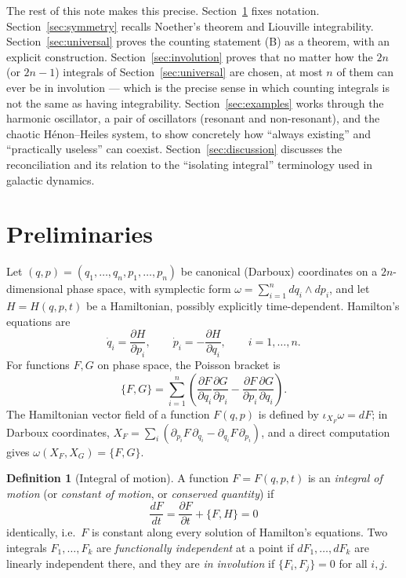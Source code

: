 \documentclass[11pt]{article}
\theoremstyle{definition}
\newtheorem{definition}[theorem]{Definition}
\theoremstyle{remark}
\newcommand{\PB}[2]{\{#1,#2\}}
\begin{document}
The rest of this note makes this precise. Section~\ref{sec:prelim} fixes
notation. Section~\ref{sec:symmetry} recalls Noether's theorem and
Liouville integrability. Section~\ref{sec:universal} proves the counting
statement (B) as a theorem, with an explicit construction. Section~\ref{sec:involution}
proves that no matter how the $2n$ (or $2n-1$) integrals of
Section~\ref{sec:universal} are chosen, at most $n$ of them can ever be in
involution --- which is the precise sense in which counting integrals is
not the same as having integrability. Section~\ref{sec:examples} works
through the harmonic oscillator, a pair of oscillators (resonant and
non-resonant), and the chaotic H\'enon--Heiles system, to show concretely
how ``always existing'' and ``practically useless'' can coexist. Section~\ref{sec:discussion}
discusses the reconciliation and its relation to the ``isolating
integral'' terminology used in galactic dynamics.

\section{Preliminaries}\label{sec:prelim}

Let $(q,p)=(q_1,\dots,q_n,p_1,\dots,p_n)$ be canonical (Darboux) coordinates
on a $2n$-dimensional phase space, with symplectic form
$\omega=\sum_{i=1}^n dq_i\wedge dp_i$, and let
$H=H(q,p,t)$ be a Hamiltonian, possibly explicitly time-dependent. Hamilton's
equations are
\begin{equation}
\dot q_i=\frac{\partial H}{\partial p_i},\qquad
\dot p_i=-\frac{\partial H}{\partial q_i},\qquad i=1,\dots,n.
\end{equation}
For functions $F,G$ on phase space, the Poisson bracket is
\begin{equation}
\PB{F}{G}=\sum_{i=1}^n\left(\frac{\partial F}{\partial q_i}\frac{\partial G}{\partial p_i}
-\frac{\partial F}{\partial p_i}\frac{\partial G}{\partial q_i}\right).
\end{equation}
The Hamiltonian vector field of a function $F(q,p)$ is defined by
$\iota_{X_F}\omega=dF$; in Darboux coordinates,
$X_F=\sum_i\left(\partial_{p_i}F\,\partial_{q_i}-\partial_{q_i}F\,\partial_{p_i}\right)$,
and a direct computation gives $\omega(X_F,X_G)=\PB{F}{G}$.

\begin{definition}[Integral of motion]
A function $F=F(q,p,t)$ is an \emph{integral of motion} (or \emph{constant
of motion}, or \emph{conserved quantity}) if
\begin{equation}
\frac{dF}{dt}=\frac{\partial F}{\partial t}+\PB{F}{H}=0
\end{equation}
identically, i.e.\ $F$ is constant along every solution of Hamilton's
equations. Two integrals $F_1,\dots,F_k$ are \emph{functionally independent}
at a point if $dF_1,\dots,dF_k$ are linearly independent there, and they are
\emph{in involution} if $\PB{F_i}{F_j}=0$ for all $i,j$.
\end{definition}
\end{document}
